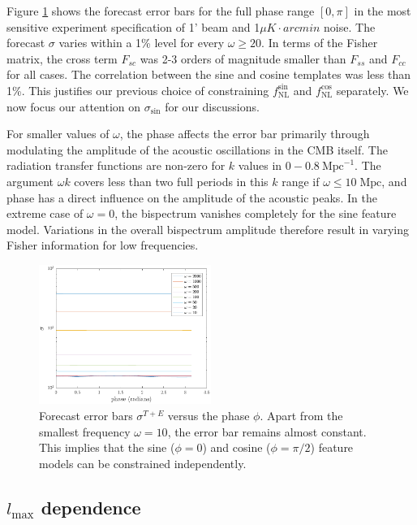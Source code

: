 Figure \ref{forecast_phase_dependence} shows the forecast error bars for the full phase range $[0,\pi]$ in the most sensitive experiment specification of 1' beam and 1$\mu K \cdot arcmin$ noise. The forecast $\sigma$ varies within a 1\% level for every $\omega\ge20$. In terms of the Fisher matrix, the cross term $F_{sc}$ was 2-3 orders of magnitude smaller than $F_{ss}$ and $F_{cc}$ for all cases. The correlation between the sine and cosine templates was less than 1\%. This justifies our previous choice of constraining $f_\text{NL}^{\sin}$ and $f_\text{NL}^{\cos}$ separately. We now focus our attention on $\sigma_{\sin}$ for our discussions.

For smaller values of $\omega$, the phase affects the error bar primarily through modulating the amplitude of the acoustic oscillations in the CMB itself. The radiation transfer functions are non-zero for $k$ values in $0 - 0.8 ~\text{Mpc}^{-1}$. The argument $\omega k$ covers less than two full periods in this $k$ range if $\omega \le 10\; \text{Mpc}$, and phase has a direct influence on the amplitude of the acoustic peaks. In the extreme case of $\omega=0$, the bispectrum vanishes completely for the sine feature model. Variations in the overall bispectrum amplitude therefore result in varying Fisher information for low frequencies.

\begin{figure}[ht]
	\centering
	\includegraphics[width=0.5\textwidth]{phase_2D.pdf}
	\caption{Forecast error bars $\sigma^{T+E}$ versus the phase $\phi$. Apart from the smallest frequency $\omega=10$, the error bar remains almost constant. This implies that the sine ($\phi=0$) and cosine ($\phi=\pi/2$) feature models can be constrained independently.}
	\label{forecast_phase_dependence}
\end{figure}

\subsection{$l_\text{max}$ dependence}

